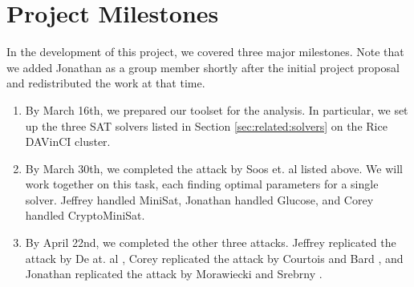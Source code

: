 \appendix
\section{Project Milestones}
\label{sec:milestones}

In the development of this project, we covered three major milestones. Note that we added Jonathan as a group member shortly after the initial project proposal and redistributed the work at that time.
\begin{enumerate}
	\item By March 16th, we prepared our toolset for the analysis. In particular, we set up the three SAT solvers listed in Section \ref{sec:related:solvers} on the Rice DAVinCI cluster.
	
	\item By March 30th, we completed the attack by Soos et. al \cite{SNC09} listed above. We will work together on this task, each finding optimal parameters for a single solver. Jeffrey handled MiniSat, Jonathan handled Glucose, and Corey handled CryptoMiniSat.
	
	\item By April 22nd, we completed the other three attacks. Jeffrey replicated the attack by De at. al \cite{DKV07}, Corey replicated the attack by Courtois and Bard \cite{CB07}, and Jonathan replicated the attack by Morawiecki and Srebrny \cite{MS13}.
\end{enumerate}